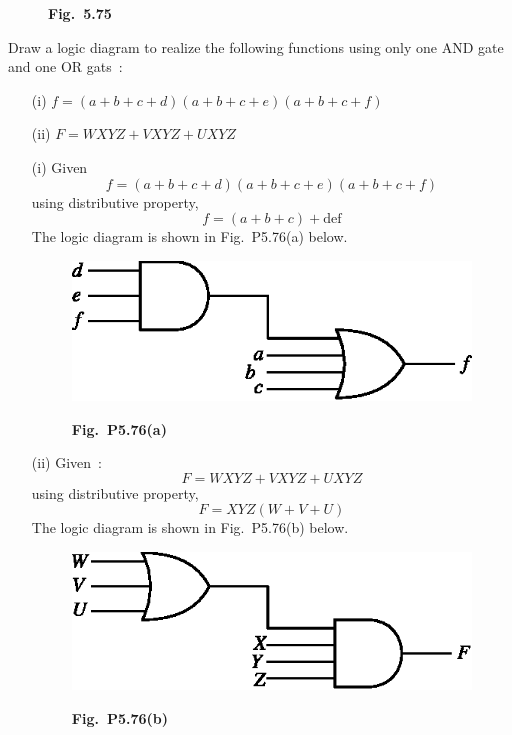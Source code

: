 \begin{solution}
\begin{figure}[H]
\smallskip
{\bf Fig.~5.75}
\end{figure}
\end{solution}

\eject

\begin{problem}\label{prob5.76}
Draw a logic diagram to realize the following functions using only one AND gate and one OR gats~:
\begin{itemize}
\item[(i)] $f=(a+b+c+d)(a+b+c+e)(a+b+c+f)$

\item[(ii)] $F=WXYZ+VXYZ+UXYZ$
\end{itemize}
\end{problem}

\begin{solution}
\begin{itemize}
\item[(i)] Given
$$
f=(a+b+c+d)(a+b+c+e)(a+b+c+f)
$$
using distributive property,
$$
f=(a+b+c)+\text{def}
$$
The logic diagram is shown in Fig.~P5.76(a) below.
\begin{figure}[H]
\centering
\includegraphics{chap5/figP1.eps}
\smallskip

{\bf Fig.~P5.76(a)}
\end{figure}

\item[(ii)] Given~:
$$
F=WXYZ+VXYZ+UXYZ
$$
using distributive property,
$$
F=XYZ(W+V+U)
$$
The logic diagram is shown in Fig.~P5.76(b) below.
\begin{figure}[H]
\centering
\includegraphics{chap5/figP2.eps}
\smallskip

{\bf Fig.~P5.76(b)}
\end{figure}
\end{itemize}
\end{solution}

